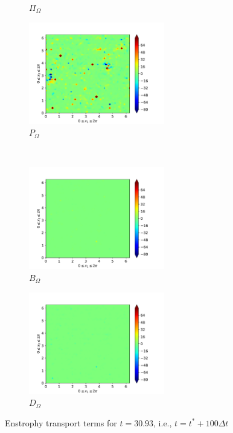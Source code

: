 \begin{figure}[H]
\begin{subfigure}{0.45\textwidth}
        \caption{$\Pi_{\Omega}$}
    \end{subfigure}
    \newline
    \begin{subfigure}{0.45\textwidth}
        \includegraphics[height=1.75in]{media/run-cds-65/P-enst-1440}
        \caption{$P_{\Omega}$}
    \end{subfigure}
    ~
    \begin{subfigure}{0.45\textwidth}
        \includegraphics[height=1.75in]{media/run-cds-65/B-enst-1440}
        \caption{$B_{\Omega}$}
    \end{subfigure}
    \newline
    \begin{subfigure}{0.45\textwidth}
        \includegraphics[height=1.75in]{media/run-cds-65/D-enst-1440}
        \caption{$D_{\Omega}$}
    \end{subfigure}
    \caption{Enstrophy transport terms for $t=30.93$, i.e., $t=t^{\ast} + 100 \Delta t$}
\end{figure}

\newpage

